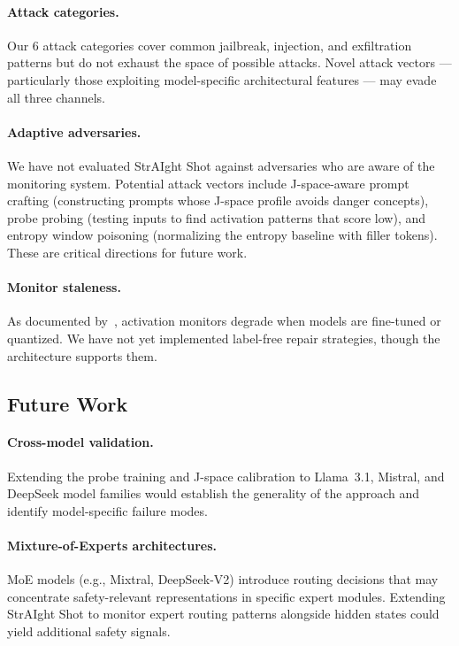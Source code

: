 \documentclass[11pt]{article}
\begin{document}
\paragraph{Attack categories.}
Our 6 attack categories cover common jailbreak, injection, and exfiltration patterns but do not exhaust the space of possible attacks. Novel attack vectors — particularly those exploiting model-specific architectural features — may evade all three channels.

\paragraph{Adaptive adversaries.}
We have not evaluated StrAIght Shot against adversaries who are aware of the monitoring system. Potential attack vectors include J-space-aware prompt crafting (constructing prompts whose J-space profile avoids danger concepts), probe probing (testing inputs to find activation patterns that score low), and entropy window poisoning (normalizing the entropy baseline with filler tokens). These are critical directions for future work.

\paragraph{Monitor staleness.}
As documented by~\cite{staleness2026}, activation monitors degrade when models are fine-tuned or quantized. We have not yet implemented label-free repair strategies, though the architecture supports them.

\subsection{Future Work}

\paragraph{Cross-model validation.}
Extending the probe training and J-space calibration to Llama~3.1, Mistral, and DeepSeek model families would establish the generality of the approach and identify model-specific failure modes.

\paragraph{Mixture-of-Experts architectures.}
MoE models (e.g., Mixtral, DeepSeek-V2) introduce routing decisions that may concentrate safety-relevant representations in specific expert modules. Extending StrAIght Shot to monitor expert routing patterns alongside hidden states could yield additional safety signals.
\end{document}
